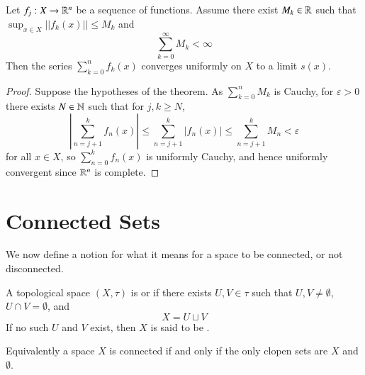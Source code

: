 \begin{namthm}
    Let $f_j:X\rightarrow \mathbb R^n$ be a sequence of functions. Assume there exist $M_k \in \mathbb R$ such that $\sup_{x\in X}||f_k(x)|| \leq M_k$ and $$\sum_{k=0}^{\infty}M_k < \infty$$ Then the series $\sum_{k=0}^nf_k(x)$ converges uniformly on $X$ to a limit $s(x)$.
\end{namthm}
\begin{proof}
    Suppose the hypotheses of the theorem. As $\sum_{k=0}^nM_k$ is Cauchy, for $\varepsilon >0$ there exists $N \in \mathbb N$ such that for $j,k \geq N$, $$\left|\sum_{n=j+1}^kf_n(x)\right|\leq \sum_{n=j+1}^k|f_n(x)| \leq \sum_{n=j+1}^kM_n < \varepsilon$$ for all $x \in X$, so $\sum_{n=0}^kf_n(x)$ is uniformly Cauchy, and hence uniformly convergent since $\mathbb R^n$ is complete.
\end{proof}


\section{Connected Sets}


We now define a notion for what it means for a space to be connected, or not disconnected.

\begin{defn}
    A topological space $(X,\tau)$ is  or  if there exists $U,V \in \tau$ such that $U,V\neq \emptyset$, $U\cap V = \emptyset$, and $$X = U\sqcup V$$
    If no such $U$ and $V$ exist, then $X$ is said to be .
\end{defn}

Equivalently a space $X$ is connected if and only if the only clopen sets are $X$ and $\emptyset$.

